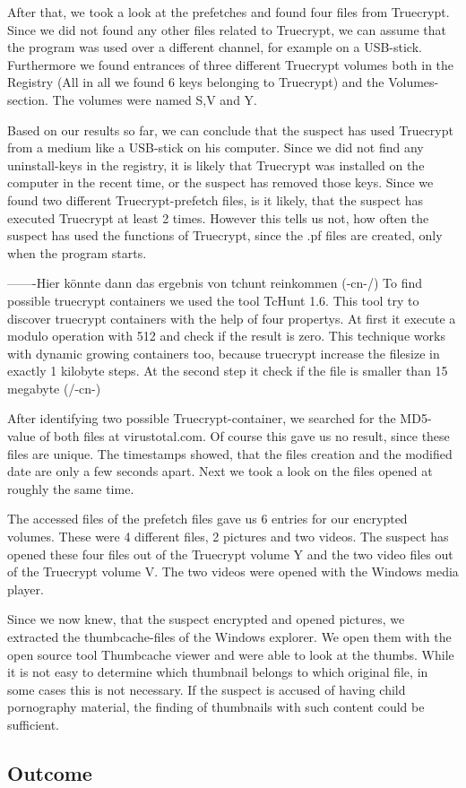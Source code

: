 After that, we took a look at the prefetches and found four files from Truecrypt. Since we did not found any other files related to Truecrypt, we can assume that the program was used over a different channel, for example on a USB-stick. Furthermore we found entrances of three different Truecrypt volumes both in the Registry (All in all we found 6 keys belonging to Truecrypt) and the Volumes-section. The volumes were named S,V and Y.

Based on our results so far, we can conclude that the suspect has used Truecrypt from a medium like a USB-stick on his computer. Since we did not find any uninstall-keys in the registry, it is likely that Truecrypt was installed on the computer in the recent time, or the suspect has removed those keys. Since we found two different Truecrypt-prefetch files, is it likely, that the suspect has executed Truecrypt at least 2 times. However this tells us not, how often the suspect has used the functions of Truecrypt, since the .pf files are created, only when the program starts.

-------Hier könnte dann das ergebnis von tchunt reinkommen
(-cn-/)
To find possible truecrypt containers we used the tool TcHunt 1.6. This tool try to discover truecrypt containers
with the help of four propertys. At first it execute a modulo operation with 512 and check if the result is zero. This technique works with dynamic 
growing containers too, because truecrypt increase the filesize in exactly 1 kilobyte steps. At the second step it check if the file is smaller than 15 megabyte
(/-cn-)

After identifying two possible Truecrypt-container, we searched for the MD5-value of both files at virustotal.com. Of course this gave us no result, since these files are unique. The timestamps showed, that the files creation and the modified date are only a few seconds apart. Next we took a look on the files opened at roughly the same time. 

The accessed files of the prefetch files gave us 6 entries for our encrypted volumes. These were 4 different files, 2 pictures and two videos.
The suspect has opened these four files out of the Truecrypt volume Y and the two video files out of the Truecrypt volume V. The two videos were opened with the Windows media player.

Since we now knew, that the suspect encrypted and opened pictures, we extracted the thumbcache-files of the Windows explorer. We open them with the open source tool Thumbcache viewer and were able to look at the thumbs. While it is not easy to determine which thumbnail belongs to which original file, in some cases this is not necessary. If the suspect is accused of having child pornography material, the finding of thumbnails with such content could be sufficient.


\subsection{Outcome}

